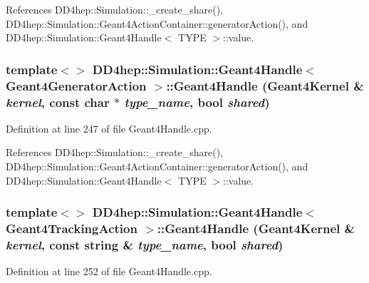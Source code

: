References DD4hep::Simulation::\_\-create\_\-share(), DD4hep::Simulation::Geant4ActionContainer::generatorAction(), and DD4hep::Simulation::Geant4Handle$<$ TYPE $>$::value.\hypertarget{class_d_d4hep_1_1_simulation_1_1_geant4_handle_a2ded3d6903b5cba4fe1b07ff4154871c}{
\subsubsection[{Geant4Handle}]{\setlength{\rightskip}{0pt plus 5cm}template$<$$>$ {\bf DD4hep::Simulation::Geant4Handle}$<$ {\bf Geant4GeneratorAction} $>$::{\bf Geant4Handle} ({\bf Geant4Kernel} \& {\em kernel}, \/  const char $\ast$ {\em type\_\-name}, \/  bool {\em shared})}}
\label{class_d_d4hep_1_1_simulation_1_1_geant4_handle_a2ded3d6903b5cba4fe1b07ff4154871c}


Definition at line 247 of file Geant4Handle.cpp.

References DD4hep::Simulation::\_\-create\_\-share(), DD4hep::Simulation::Geant4ActionContainer::generatorAction(), and DD4hep::Simulation::Geant4Handle$<$ TYPE $>$::value.\hypertarget{class_d_d4hep_1_1_simulation_1_1_geant4_handle_ae6410e60af2369a411dbf50b5aad0c83}{
\subsubsection[{Geant4Handle}]{\setlength{\rightskip}{0pt plus 5cm}template$<$$>$ {\bf DD4hep::Simulation::Geant4Handle}$<$ {\bf Geant4TrackingAction} $>$::{\bf Geant4Handle} ({\bf Geant4Kernel} \& {\em kernel}, \/  const {\bf string} \& {\em type\_\-name}, \/  bool {\em shared})}}
\label{class_d_d4hep_1_1_simulation_1_1_geant4_handle_ae6410e60af2369a411dbf50b5aad0c83}


Definition at line 252 of file Geant4Handle.cpp.

